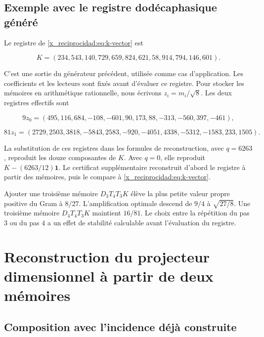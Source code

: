 \subsection{Exemple avec le registre dodécaphasique généré}

Le registre de \eqref{x_reciprocidad:eq:k-vector} est



\begin{equation}
K=(234,543,140,729,659,824,621,58,914,794,146,601).
\label{x_reciprocidad:nuc11:eq:10}
\end{equation}



C’est une sortie du générateur précédent, utilisée comme cas
d’application. Les coefficients et les lecteurs sont fixés avant
d’évaluer ce registre. Pour stocker les mémoires en arithmétique
rationnelle, nous écrivons \(z_i=m_i/\sqrt8\).
Les deux registres effectifs sont



\[
9z_0=(495,116,684,-108,-601,90,173,88,-313,-560,397,-461),
\]





\begin{equation}
81z_1=(2729,2503,3818,-5843,2583,-920,-4051,4338,-5312,-1583,233,1505).
\label{x_reciprocidad:nuc11:eq:11}
\end{equation}



La substitution de ces registres dans les formules de reconstruction,
avec \(q=6263\), reproduit les douze composantes de \(K\).
Avec \(q=0\), elle reproduit \(K-(6263/12)\mathbf1\).
Le certificat supplémentaire reconstruit d’abord le registre à partir
des mémoires, puis le compare à \eqref{x_reciprocidad:eq:k-vector}.

Ajouter une troisième mémoire \(D_3T_4T_3K\) élève la plus petite valeur
propre positive du Gram à \(8/27\).
L’amplification optimale descend de \(9/4\) à \(\sqrt{27/8}\).
Une troisième mémoire \(D_4T_4T_3K\) maintient \(16/81\).
Le choix entre la répétition du pas \(3\) ou du pas \(4\) a
un effet de stabilité calculable avant l’évaluation du registre.

\section{Reconstruction du projecteur dimensionnel à partir de deux mémoires}

\subsection{Composition avec l’incidence déjà construite}


